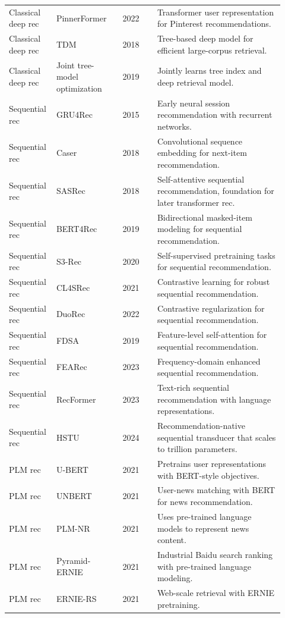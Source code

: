 \documentclass[11pt]{article}
\begin{document}
\begin{longtable}{@{}p{0.13\linewidth}p{0.23\linewidth}p{0.12\linewidth}p{0.44\linewidth}@{}}
Classical deep rec & PinnerFormer & 2022 & Transformer user representation for Pinterest recommendations.\\
Classical deep rec & TDM & 2018 & Tree-based deep model for efficient large-corpus retrieval.\\
Classical deep rec & Joint tree-model optimization & 2019 & Jointly learns tree index and deep retrieval model.\\
Sequential rec & GRU4Rec & 2015 & Early neural session recommendation with recurrent networks.\\
Sequential rec & Caser & 2018 & Convolutional sequence embedding for next-item recommendation.\\
Sequential rec & SASRec & 2018 & Self-attentive sequential recommendation, foundation for later transformer rec.\\
Sequential rec & BERT4Rec & 2019 & Bidirectional masked-item modeling for sequential recommendation.\\
Sequential rec & S3-Rec & 2020 & Self-supervised pretraining tasks for sequential recommendation.\\
Sequential rec & CL4SRec & 2021 & Contrastive learning for robust sequential recommendation.\\
Sequential rec & DuoRec & 2022 & Contrastive regularization for sequential recommendation.\\
Sequential rec & FDSA & 2019 & Feature-level self-attention for sequential recommendation.\\
Sequential rec & FEARec & 2023 & Frequency-domain enhanced sequential recommendation.\\
Sequential rec & RecFormer & 2023 & Text-rich sequential recommendation with language representations.\\
Sequential rec & HSTU & 2024 & Recommendation-native sequential transducer that scales to trillion parameters.\\
PLM rec & U-BERT & 2021 & Pretrains user representations with BERT-style objectives.\\
PLM rec & UNBERT & 2021 & User-news matching with BERT for news recommendation.\\
PLM rec & PLM-NR & 2021 & Uses pre-trained language models to represent news content.\\
PLM rec & Pyramid-ERNIE & 2021 & Industrial Baidu search ranking with pre-trained language modeling.\\
PLM rec & ERNIE-RS & 2021 & Web-scale retrieval with ERNIE pretraining.\\

\end{longtable}
\end{document}

